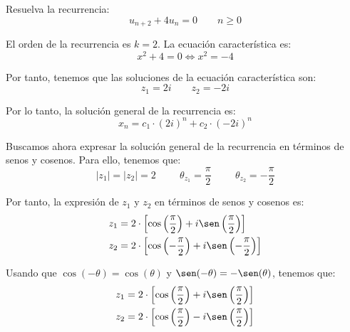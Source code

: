 \begin{ejercicio}\label{ej:recurrenciaComplejos}
    Resuelva la recurrencia:
    \begin{equation*}
        u_{n+2} + 4u_n = 0 \qquad n\geq 0
    \end{equation*}

    El orden de la recurrencia es $k=2$. La ecuación característica es:
    \begin{equation*}
        x^2 + 4 = 0 \Longleftrightarrow x^2 = -4
    \end{equation*}

    Por tanto, tenemos que las soluciones de la ecuación característica son:
    \begin{equation*}
        z_1 = 2i \qquad z_2 = -2i
    \end{equation*}

    Por lo tanto, la solución general de la recurrencia es:
    \begin{equation*}
        x_n = c_1\cdot (2i)^n + c_2\cdot (-2i)^n
    \end{equation*}

    Buscamos ahora expresar la solución general de la recurrencia en términos de senos y cosenos. Para ello, tenemos que:
    \begin{equation*}
        |z_1| = |z_2| = 2 \hspace{1cm} \theta_{z_1} = \frac{\pi}{2} \hspace{1cm} \theta_{z_2} = -\frac{\pi}{2}
    \end{equation*}

    Por tanto, la expresión de $z_1$ y $z_2$ en términos de senos y cosenos es:
    \begin{align*}
        z_1 &= 2\cdot \left[\cos\left(\frac{\pi}{2}\right) + i\sen\left(\frac{\pi}{2}\right)\right]\\
        z_2 &= 2\cdot \left[\cos\left(-\frac{\pi}{2}\right) + i\sen\left(-\frac{\pi}{2}\right)\right]
    \end{align*}

    Usando que $\cos(-\theta) = \cos(\theta)$ y $\sen(-\theta) = -\sen(\theta)$, tenemos que:
    \begin{align*}
        z_1 &= 2\cdot \left[\cos\left(\frac{\pi}{2}\right) + i\sen\left(\frac{\pi}{2}\right)\right]\\
        z_2 &= 2\cdot \left[\cos\left(\frac{\pi}{2}\right) - i\sen\left(\frac{\pi}{2}\right)\right]
    \end{align*}


\end{ejercicio}
